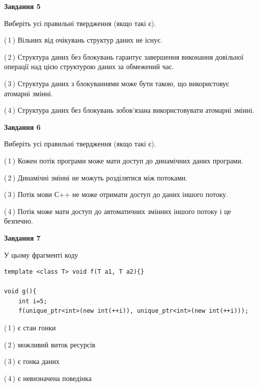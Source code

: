 \documentclass[12pt, ukrainian]{article}
\begin{document}
\begin {large}
{\begin{center}
\textbf{Завдання 5}
\end{center}

Виберіть усі правильні твердження (якщо такі є).\par
\vspace{2mm}

(\,1\,) Вільних від очікувань структур даних не існує.%

(\,2\,) Структура даних без блокувань гарантує завершення виконання довільної операції над цією структурою даних за обмежений час.%

(\,3\,) Структура даних з блокуваннями може бути такою, що використовує атомарні змінні.%

(\,4\,) Структура даних без блокувань зобов’язана використовувати атомарні змінні.%
\newpage


\begin{center}
\textbf{Завдання 6}
\end{center}

Виберіть усі правильні твердження (якщо такі є).\par
\vspace{2mm}

(\,1\,) Кожен потік програми може мати доступ до динамічних даних програми.%

(\,2\,) Динамічні змінні не можуть розділятися між потоками.%

(\,3\,) Потік мови С++ не може отримати доступ до даних іншого потоку.%

(\,4\,) Потік може мати доступ до автоматичних змінних іншого потоку і це безпечно.%


\begin{center}
\textbf{Завдання 7}
\end{center}

У цьому фрагменті коду
\begin{verbatim}
template <class T> void f(T a1, T a2){}

void g(){
    int i=5;
    f(unique_ptr<int>(new int(++i)), unique_ptr<int>(new int(++i)));
\end{verbatim}

(\,1\,) є стан гонки%

(\,2\,) можливий виток ресурсів%

(\,3\,) є гонка даних%

(\,4\,) є невизначена поведінка%

}
\end {large}

\vspace{4mm}
\newpage
\end{document}
